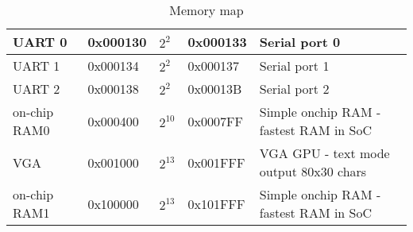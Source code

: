 \begin{table}[h]
\begin{tabular}{|l|l|l|l|l|}
        UART 0              & 0x000130      & $2^{2}$       & 0x000133     & Serial port 0                                  \\ \hline
        UART 1              & 0x000134      & $2^{2}$       & 0x000137     & Serial port 1                                  \\ \hline
        UART 2              & 0x000138      & $2^{2}$       & 0x00013B     & Serial port 2                                  \\ \hline
        on-chip RAM0        & 0x000400      & $2^{10}$      & 0x0007FF     & Simple onchip RAM - fastest RAM in SoC         \\ \hline
        VGA                 & 0x001000      & $2^{13}$      & 0x001FFF     & VGA GPU - text mode output 80x30 chars         \\ \hline
        on-chip RAM1        & 0x100000      & $2^{13}$      & 0x101FFF     & Simple onchip RAM - fastest RAM in SoC         \\ \hline
    \end{tabular}
    \caption{Memory map}
    \label{tab:memory_map}
\end{table}
